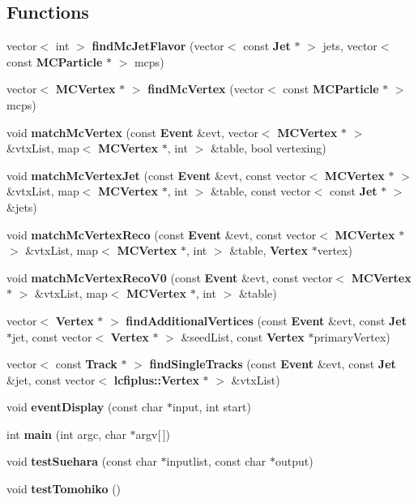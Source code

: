 \subsection*{Functions}
\begin{DoxyCompactItemize}
\item 
vector$<$ int $>$ {\bf find\-Mc\-Jet\-Flavor} (vector$<$ const {\bf Jet} $\ast$ $>$ jets, vector$<$ const {\bf M\-C\-Particle} $\ast$ $>$ mcps)
\item 
vector$<$ {\bf M\-C\-Vertex} $\ast$ $>$ {\bf find\-Mc\-Vertex} (vector$<$ const {\bf M\-C\-Particle} $\ast$ $>$ mcps)
\item 
void {\bf match\-Mc\-Vertex} (const {\bf Event} \&evt, vector$<$ {\bf M\-C\-Vertex} $\ast$ $>$ \&vtx\-List, map$<$ {\bf M\-C\-Vertex} $\ast$, int $>$ \&table, bool vertexing)
\item 
void {\bf match\-Mc\-Vertex\-Jet} (const {\bf Event} \&evt, const vector$<$ {\bf M\-C\-Vertex} $\ast$ $>$ \&vtx\-List, map$<$ {\bf M\-C\-Vertex} $\ast$, int $>$ \&table, const vector$<$ const {\bf Jet} $\ast$ $>$ \&jets)
\item 
void {\bf match\-Mc\-Vertex\-Reco} (const {\bf Event} \&evt, const vector$<$ {\bf M\-C\-Vertex} $\ast$ $>$ \&vtx\-List, map$<$ {\bf M\-C\-Vertex} $\ast$, int $>$ \&table, {\bf Vertex} $\ast$vertex)
\item 
void {\bf match\-Mc\-Vertex\-Reco\-V0} (const {\bf Event} \&evt, const vector$<$ {\bf M\-C\-Vertex} $\ast$ $>$ \&vtx\-List, map$<$ {\bf M\-C\-Vertex} $\ast$, int $>$ \&table)
\item 
vector$<$ {\bf Vertex} $\ast$ $>$ {\bf find\-Additional\-Vertices} (const {\bf Event} \&evt, const {\bf Jet} $\ast$jet, const vector$<$ {\bf Vertex} $\ast$ $>$ \&seed\-List, const {\bf Vertex} $\ast$primary\-Vertex)
\item 
vector$<$ const {\bf Track} $\ast$ $>$ {\bf find\-Single\-Tracks} (const {\bf Event} \&evt, const {\bf Jet} \&jet, const vector$<$ {\bf lcfiplus\-::\-Vertex} $\ast$ $>$ \&vtx\-List)
\item 
void {\bf event\-Display} (const char $\ast$input, int start)
\item 
int {\bf main} (int argc, char $\ast$argv[$\,$])
\item 
void {\bf test\-Suehara} (const char $\ast$inputlist, const char $\ast$output)
\item 
void {\bf test\-Tomohiko} ()
\end{DoxyCompactItemize}
